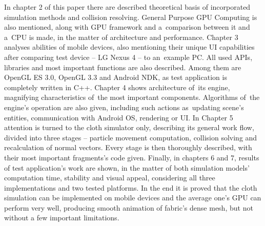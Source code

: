 In chapter 2 of this paper there are described theoretical basis of incorporated simulation methods and collision resolving. General Purpose GPU Computing is also mentioned, along with GPU framework and a~comparison between it and a~CPU is made, in the matter of architecture and performance. Chapter 3 analyses abilities of mobile devices, also mentioning their unique UI capabilities after comparing test device -- LG Nexus 4 -- to an~example PC. All used APIs, libraries and most important functions are also described. Among them are OpenGL ES 3.0, OpenGL 3.3 and Android NDK, as test application is completely written in C++. Chapter 4 shows architecture of~its engine, magnifying characteristics of~the most important components. Algorithms of~the engine's operation are also given, including such actions as~updating scene's entities, communication with Android OS, rendering or UI. In Chapter 5 attention is turned to the cloth simulator only, describing its general work flow, divided into three stages -- particle movement computation, collision solving and recalculation of normal vectors. Every stage is then thoroughly described, with their most important fragments's code given. Finally, in chapters 6 and 7, results of test application's work are shown, in the matter of both simulation models' computation time, stability and visual appeal, considering all three implementations and two tested platforms. In the end it is proved that the cloth simulation can be implemented on mobile devices and the average one's GPU can perform very well, producing smooth animation of fabric's dense mesh, but not without a few important limitations.